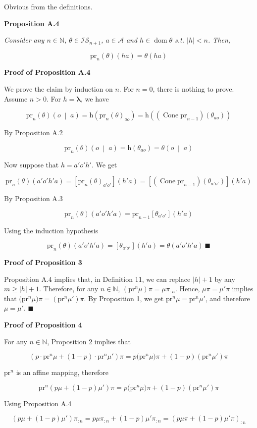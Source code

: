 \documentclass[a4paper]{article}
\newcommand{\Co}[1]{}
\DeclareMathOperator{\Dom}{dom}
\newcommand{\AP}[1]{\left(#1\right)}
\newcommand{\AB}[1]{\left[#1\right]}
\newcommand{\APM}[2]{\left(#1\;\middle\vert\;#2\right)}
\newcommand{\Nats}{\mathbb{N}}
\newcommand{\Estr}{\boldsymbol{\lambda}}
\newcommand{\Abs}[1]{\left\vert #1 \right\vert}
\newcommand{\A}{\mathcal{A}}
\DeclareMathOperator{\Cone}{Cone}
\newcommand{\Ht}{\mathrm{h}}
\newcommand{\IS}{\mathcal{IS}}
\newcommand{\Prj}{\mathrm{pr}}
\begin{document}
Obvious from the definitions.

\textbf{Proposition A.4}\Co{b}

\textit{Consider any $n\in\Nats$, $\theta\in\IS_{n+1}$, $a\in\A$ and $h\in\Dom\theta$ s.t. $\Abs{h}< n$. Then,}\Co{i} 

$$\Prj_n(\theta)(ha)=\theta(ha)$$

\textbf{Proof of Proposition A.4}\Co{b}

We prove the claim by induction on $n$. For $n=0$, there is nothing to prove. Assume $n>0$. For $h=\Estr$, we have

$$\Prj_n(\theta)\APM{o}{a}=\Ht\AP{\Prj_n(\theta)_{ao}}=\Ht\AP{\AP{\Cone\Prj_{n-1}}\AP{\theta_{ao}}}$$

By Proposition A.2

$$\Prj_n(\theta)\APM{o}{a}=\Ht\AP{\theta_{ao}}=\theta\APM{o}{a}$$

Now suppose that $h=a'o'h'$. We get

$$\Prj_n(\theta)\AP{a'o'h'a}=\AB{\Prj_n(\theta)_{a'o'}}\AP{h'a}=\AB{\AP{\Cone\Prj_{n-1}}\AP{\theta_{a'o'}}}\AP{h'a}$$

By Proposition A.3

$$\Prj_n(\theta)\AP{a'o'h'a}=\Prj_{n-1}\AB{\theta_{a'o'}}\AP{h'a}$$

Using the induction hypothesis

$$\Prj_n(\theta)\AP{a'o'h'a}=\AB{\theta_{a'o'}}\AP{h'a}=\theta\AP{a'o'h'a}\ \blacksquare$$

\textbf{Proof of Proposition 3}\Co{b}

Proposition A.4 implies that, in Definition 11, we can replace $\Abs{h}+1$ by any $m\geq\Abs{h}+1$. Therefore, for any $n\in\Nats$, $\AP{\Prj^n\mu}\pi=\mu\pi_{:n}$. Hence, $\mu\pi=\mu'\pi$ implies that $\big(\Prj^n\mu\big)\pi=\AP{\Prj^n\mu'}\pi$. By Proposition 1, we get $\Prj^n\mu=\Prj^n\mu'$, and therefore $\mu=\mu'$. $\blacksquare$

\textbf{Proof of Proposition 4}\Co{b}

For any $n\in\Nats$, Proposition 2 implies that

$$\AP{p\cdot\Prj^n\mu+(1-p)\cdot\Prj^n\mu'}\pi=p\big(\Prj^n\mu\big)\pi+(1-p)\AP{\Prj^n\mu'}\pi$$

$\Prj^n$ is an affine mapping, therefore

$$\Prj^n\AP{p\mu+(1-p)\mu'}\pi=p\big(\Prj^n\mu\big)\pi+(1-p)\AP{\Prj^n\mu'}\pi$$

Using Proposition A.4

$$\AP{p\mu+(1-p)\mu'}\pi_{:n}=p\mu\pi_{:n}+(1-p)\mu'\pi_{:n}=\AP{p\mu\pi+(1-p)\mu'\pi}_{:n}$$
\end{document}
